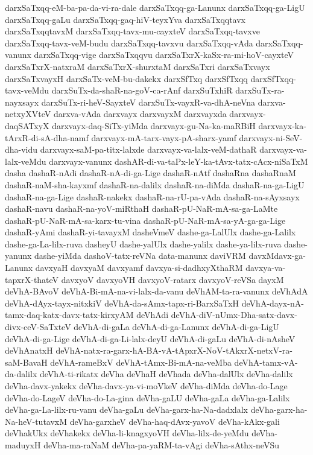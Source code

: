 {darxSaTxqq-eM-ba-pa-da-vi-ra-dale
darxSaTxqq-ga-Lanunx
darxSaTxqq-ga-LigU
darxSaTxqq-gaLu
darxSaTxqq-gaq-hiV-teyxYva
darxSaTxqqtavx
darxSaTxqqtavxM
darxSaTxqq-tavx-mu-cayxteV
darxSaTxqq-tavxve
darxSaTxqq-tavx-veM-budu
darxSaTxqq-tavxvu
darxSaTxqq-vAda
darxSaTxqq-vanunx
darxSaTxqq-vige
darxSaTxqqvu
darxSaTxrX-kaSx-ra-mi-hoV-cayxteV
darxSaTxrX-natxraM
darxSaTxrX-shurxtaM
darxSaTxri
darxSaTxvayx
darxSaTxvayxH
darxSaTx-veM-bu-dakekx
darxSfTxq
darxSfTxqq
darxSfTxqq-tavx-veMdu
darxSuTx-da-shaR-na-goV-ca-rAnf
darxSuTxhiR
darxSuTx-ra-nayxsayx
darxSuTx-ri-heV-SayxteV
darxSuTx-vayxR-va-dhA-neVna
darxva-netxyXVteV
darxva-vAda
darxvayx
darxvayxM
darxvayxda
darxvayx-daqSATxyX
darxvayx-daq-SiTx-yiMda
darxvayx-gu-Na-ka-maRBiH
darxvayx-ka-tArxR-di-sA-dha-namf
darxvayx-mA-tarx-vayx-pA-sharx-yamf
darxvayx-ni-SeV-dha-vidu
darxvayx-saM-pa-titx-lalxde
darxvayx-va-lalx-veM-dathaR
darxvayx-va-lalx-veMdu
darxvayx-vanunx
dashAR-di-va-taPx-leY-ka-tAvx-tatx-cAcx-niSaTxM
dasha
dashaR-nAdi
dashaR-nA-di-ga-Lige
dashaR-nAtf
dashaRna
dashaRnaM
dashaR-naM-sha-kayxmf
dashaR-na-dalilx
dashaR-na-diMda
dashaR-na-ga-LigU
dashaR-na-ga-Lige
dashaR-nakekx
dashaR-na-rU-pa-vAda
dashaR-na-sAyxsayx
dashaR-navu
dashaR-na-yoV-miRthaH
dashaR-pU-NaR-mA-sa-ga-LaMte
dashaR-pU-NaR-mA-sa-karx-tu-vina
dashaR-pU-NaR-mA-sa-yA-ga-ga-Lige
dashaR-yAmi
dashaR-yi-tavayxM
dasheVmeV
dashe-ga-LalUlx
dashe-ga-Lalilx
dashe-ga-La-lilx-ruva
dasheyU
dashe-yalUlx
dashe-yalilx
dashe-ya-lilx-ruva
dashe-yanunx
dashe-yiMda
dashoV-tatx-reVNa
data-manunx
daviVRM
davxMdavx-ga-Lanunx
davxyaH
davxyaM
davxyamf
davxya-si-dadhxyXthaRM
davxya-va-tapxrX-thateV
davxyoV
davxyoVH
davxyoV-ratarx
davxyoV-reVSa
dayxM
deVhA-BAvoV
deVhA-Bi-mA-na-vi-lalx-da-vanu
deVhAM-ta-ra-vanunx
deVhAdA
deVhA-dAyx-tayx-nitxkiV
deVhA-da-sAmx-tapx-ri-BarxSaTxH
deVhA-dayx-nA-tamx-daq-katx-davx-tatx-kirxyAM
deVhAdi
deVhA-diV-nUmx-Dha-satx-davx-divx-ceV-SaTxteV
deVhA-di-gaLa
deVhA-di-ga-Lanunx
deVhA-di-ga-LigU
deVhA-di-ga-Lige
deVhA-di-ga-Li-lalx-deyU
deVhA-di-gaLu
deVhA-di-nAsheV
deVhAnatxH
deVhA-natx-ra-garx-hA-BA-vA-tApxrX-NoV-tAkxrX-netxV-ra-saM-BavaH
deVhA-rameBxV
deVhA-tAmx-Bi-mA-na-veMba
deVhA-tamx-vA-da-dalilx
deVhA-ti-rikatx
deVha
deVhaH
deVhada
deVha-dalUlx
deVha-dalilx
deVha-davx-yakekx
deVha-davx-ya-vi-moVkeV
deVha-diMda
deVha-do-Lage
deVha-do-LageV
deVha-do-La-gina
deVha-gaLU
deVha-gaLa
deVha-ga-Lalilx
deVha-ga-La-lilx-ru-vanu
deVha-gaLu
deVha-garx-ha-Na-dadxlalx
deVha-garx-ha-Na-heV-tutavxM
deVha-garxheV
deVha-haq-dAvx-yavoV
deVha-kAkx-gali
deVhakUkx
deVhakekx
deVha-li-knagxyoVH
deVha-lilx-de-yeMdu
deVha-maduyxH
deVha-ma-raNaM
deVha-pa-yaRM-ta-vAgi
deVha-sAthx-neVSu
}
